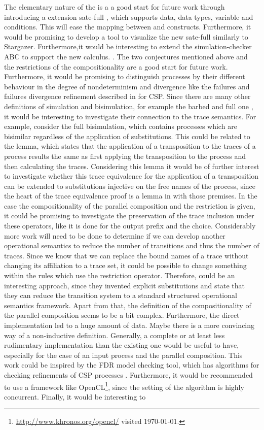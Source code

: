 The elementary nature of the \picalc{} is a a good start for future work through introducing a extension sate-full \picalc{}, which supports data, data types, variable and conditions. This will ease the mapping between \oz{} and \picalc{} constructs. Furthermore, it would be promising to develop a tool to visualize the new sate-full \picalc{} similarly to Stargazer. Furthermore,it would be interesting to extend the simulation-checker ABC to support the new calculus. . 
The two conjectures mentioned above and the restrictions of the compositionality are a good start for future work. Furthermore, it would be promising to distinguish processes by their different behaviour in the degree of nondeterminism and divergence like the failures and failures divergence refinement described in \cite{roscoe} for \gls{CSP}. Since there are many other definitions of simulation and bisimulation, for example the barbed and full one \cite{sangiorgi}, it would be interesting to investigate their connection to the trace semantics. For example, consider the full bisimulation, which contains processes which are bisimilar regardless of the application of substitutions. This could be related to the lemma, which states that the application of a transposition to the traces of a process results the same as first applying the transposition to the process and then calculating the traces. Considering this lemma it would be of further interest to investigate whether this trace equivalence for the application of a transposition can be extended to substitutions injective on the free names of the process, since the heart of the trace equivalence proof is a lemma in \cite{sangiorgi} with those premises. In the case the compositionality of the parallel composition and the restriction is given, it could be promising to investigate the preservation of the trace inclusion under these operators, like it is done for the output prefix and the choice. Considerably more work will need to be done to determine if we can develop another operational semantics to reduce the number of transitions and thus the number of traces. Since we know that we can replace the bound names of a trace without changing its affiliation to a trace set, it could be possible to change something within the rules which use the restriction operator. Therefore, \cite{paolaExplicitSubs} could be an interesting approach, since they invented explicit substitutions and state that they can reduce the transition system to a standard structured operational semantics framework. Apart from that, the definition of the compositionality of the parallel composition seems to be a bit complex. Furthermore, the direct implementation led to a huge amount of data. Maybe there is a more convincing way of a non-inductive definition. Generally, a complete or at least less rudimentary implementation than the existing one would be useful to have, especially for the case of an input process and the parallel composition. This work could be inspired by the FDR model checking tool, which has algorithms for checking refinements of CSP processes \cite{fdr}. Furthermore, it would be recommended to use a framework like OpenCL\footnote{\url{http://www.khronos.org/opencl/} visited \today.}, since the setting of the algorithm is highly concurrent. Finally, it would be interesting to 